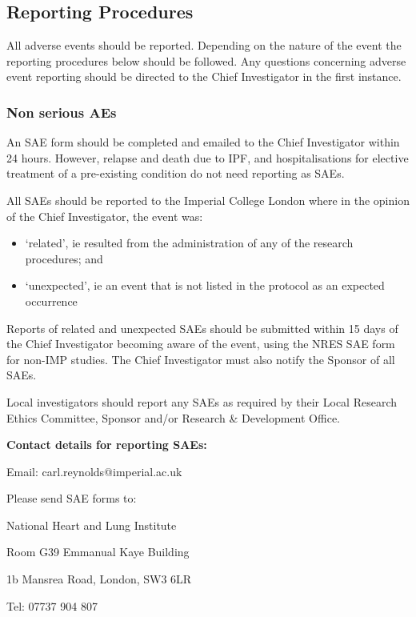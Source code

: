 \documentclass[a4paper,10pt]{article}
\begin{document}
\subsection{Reporting Procedures}
All adverse events should be reported. Depending on the nature of the event the reporting procedures below should be followed. Any questions concerning adverse event reporting should be directed to the Chief Investigator in the first instance.  

\subsubsection{Non serious AEs}
An SAE form should be completed and emailed to the Chief Investigator within 24 hours. However, relapse and death due to IPF, and hospitalisations for elective treatment of a pre-existing condition do not need reporting as SAEs.

All SAEs should be reported to the Imperial College London where in the opinion of the Chief Investigator, the event was:  \begin{itemize} 
                                                                                                                           \item ‘related’, ie resulted from the administration of any of the research procedures; and
					   \item ‘unexpected’, ie an event that is not listed in the protocol as an expected occurrence
                                                                                                                          \end{itemize} 

                                                                                                                          
Reports of related and unexpected SAEs should be submitted within 15 days of the Chief Investigator becoming aware of the event, using the NRES SAE form for non-IMP studies. The Chief Investigator must also notify the Sponsor of all SAEs.

Local investigators should report any SAEs as required by their Local Research Ethics Committee, Sponsor and/or Research \& Development Office.

\begin{center}
\textbf{Contact details for reporting SAEs:}

Email: carl.reynolds@imperial.ac.uk

Please send SAE forms to: 

National Heart and Lung Institute

Room G39 Emmanual Kaye Building

1b Mansrea Road, London, SW3 6LR 

Tel: 07737 904 807

\end{center}
\end{document}
